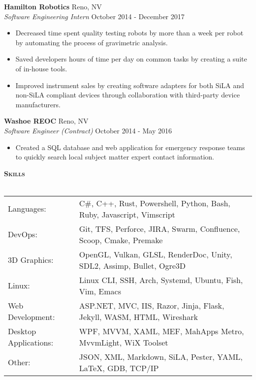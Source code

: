 \documentclass[a4paper]{article}
\newcommand{\lineunder} {
    \vspace*{-8pt} \\
    \hspace*{-18pt} \hrulefill \\
}
\newcommand{\header} [1] {
    {\hspace*{-18pt}\vspace*{6pt} \large \textbf{\textsc{#1}}}
    \vspace*{-6pt} \lineunder
    \vspace*{4pt}
}
\begin{document}
\textbf{Hamilton Robotics} \hfill Reno, NV\\
\textit{Software Engineering Intern} \hfill October 2014 - December 2017\\
\vspace{-1mm}
\begin{itemize} \itemsep 1pt
	\item Decreased time spent quality testing robots by more than a week per robot by automating the process of gravimetric analysis.
	\item Saved developers hours of time per day on common tasks by creating a suite of in-house tools.
	\item Improved instrument sales by creating software adapters for both SiLA and non-SiLA compliant devices through collaboration with third-party device manufacturers.
\end{itemize}
\textbf{Washoe REOC} \hfill Reno, NV\\
\textit{Software Engineer (Contract)} \hfill October 2014 - May 2016\\
\vspace{-1mm}
\begin{itemize} \itemsep 1pt
	\item Created a SQL database and web application for emergency response teams to quickly search local subject matter expert contact information.
\end{itemize}

\header{Skills}
\begingroup
\setlength{\tabcolsep}{5pt} %
\renewcommand{\arraystretch}{1.1} %
\begin{tabular}{ l l }
	Languages:            & C\#, C++, Rust, Powershell, Python, Bash, Ruby, Javascript, Vimscript  \strut  \\
	DevOps:               & Git, TFS, Perforce, JIRA, Swarm, Confluence, Scoop, Cmake, Premake \strut      \\
	3D Graphics:          & OpenGL, Vulkan, GLSL, RenderDoc, Unity, SDL2, Assimp, Bullet, Ogre3D \strut    \\
	Linux:                & Linux CLI, SSH, Arch,  Systemd, Ubuntu, Fish, Vim, Emacs   \strut              \\
	Web Development:      & ASP.NET, MVC, IIS, Razor, Jinja, Flask, Jekyll, WASM, HTML, Wireshark \strut   \\
	Desktop Applications: & WPF, MVVM, XAML, MEF, MahApps Metro, MvvmLight, WiX Toolset \strut             \\
	Other:                & JSON, XML, Markdown, SiLA, Pester, YAML, LaTeX, GDB, TCP/IP  \strut            \\
\end{tabular}
\endgroup
\vspace{1mm}
\end{document}
